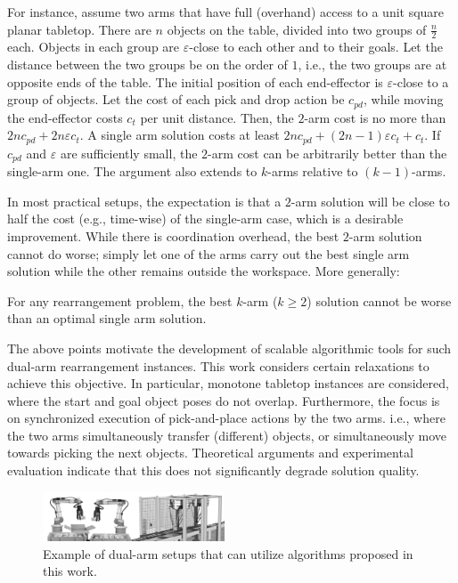 For instance, assume two arms that have full (overhand) access to a 
unit square planar tabletop. There are $n$ objects on the table, 
divided into two groups of $\frac{n}{2}$ each. Objects in each group 
are $\varepsilon$-close to each other and to their goals. Let the 
distance between the two groups be on the order of $1$, i.e., the two 
groups are at opposite ends of the table. The initial position of each 
end-effector is $\varepsilon$-close to a group of objects. Let the cost 
of each pick and drop action be $c_{pd}$, while moving the 
end-effector costs $c_t$ per unit distance. Then, the $2$-arm 
cost is no more than $2nc_{pd} + 2n\varepsilon c_t $.  A single arm 
solution costs at least $2nc_{pd} + (2n-1)\varepsilon c_t + 
c_t$. If $c_{pd}$ and $\varepsilon$ are sufficiently small, the $2$-arm 
cost can be arbitrarily better than the single-arm one. The argument 
also extends to $k$-arms relative to $(k-1)$-arms.

In most practical setups, the expectation is that a $2$-arm solution
will be close to half the cost (e.g., time-wise) of the single-arm 
case, which is a desirable improvement. While there 
is coordination overhead, the best $2$-arm solution cannot do worse; simply 
let one of the arms carry out the best single arm solution while the 
other remains outside the workspace. More generally:

\begin{lemma}\label{l:2-arm-no-worse}
For any rearrangement problem, the best $k$-arm ($k \ge 2$) solution
cannot be worse than an optimal single arm solution.
\end{lemma}

The above points motivate the development of scalable algorithmic
tools for such dual-arm rearrangement instances. This work considers
certain relaxations to achieve this objective. In particular,
monotone tabletop instances are considered, where the start and goal
object poses do not overlap.  Furthermore, the focus is on
synchronized execution of pick-and-place actions by the two arms. i.e., where the two arms simultaneously transfer (different) objects, or simultaneously move towards picking the next objects.
Theoretical arguments and experimental evaluation indicate that this does not significantly degrade solution
quality.

\begin{figure}[t]
	\centering
	\includegraphics[width=0.48\textwidth]{figures/two_arms}
	\caption{Example of dual-arm setups that can utilize
	algorithms proposed in this work.}
	\label{fig:two_arms}
\end{figure}



